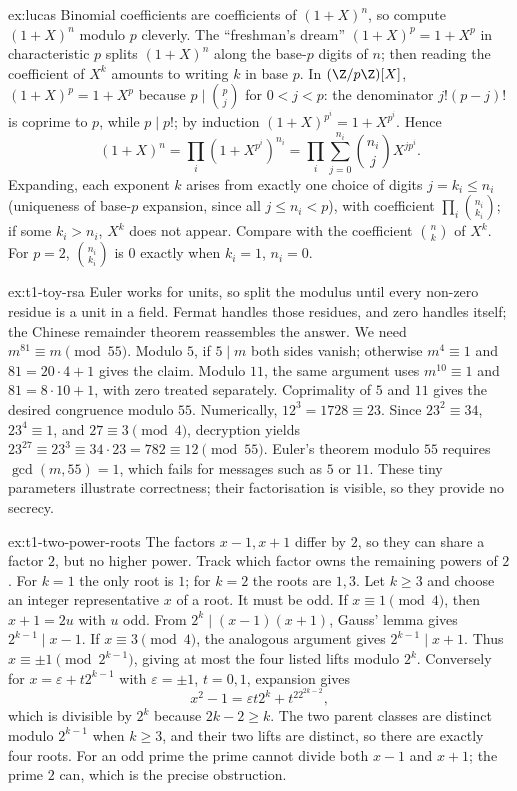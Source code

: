\begin{solution}{ex:lucas}
\idea Binomial coefficients are coefficients of $(1+X)^n$, so compute $(1+X)^n$ modulo $p$ cleverly. The ``freshman's dream'' $(1+X)^p=1+X^p$ in characteristic $p$ splits $(1+X)^n$ along the base-$p$ digits of $n$; then reading the coefficient of $X^k$ amounts to writing $k$ in base $p$.
\writeup In $(\Z/p\Z)[X]$, $(1+X)^p=1+X^p$ because $p\mid\binom pj$ for $0<j<p$: the denominator $j!(p-j)!$ is coprime to $p$, while $p\mid p!$; by induction $(1+X)^{p^i}=1+X^{p^i}$. Hence
\[
(1+X)^n=\prod_i\left(1+X^{p^i}\right)^{n_i}=\prod_i\sum_{j=0}^{n_i}\binom{n_i}jX^{jp^i}.
\]
Expanding, each exponent $k$ arises from exactly one choice of digits $j=k_i\le n_i$ (uniqueness of base-$p$ expansion, since all $j\le n_i<p$), with coefficient $\prod_i\binom{n_i}{k_i}$; if some $k_i>n_i$, $X^k$ does not appear. Compare with the coefficient $\binom nk$ of $X^k$. For $p=2$, $\binom{n_i}{k_i}$ is $0$ exactly when $k_i=1$, $n_i=0$.
\end{solution}

\begin{solution}{ex:t1-toy-rsa}
\idea Euler works for units, so split the modulus until every non-zero residue is a unit in a field. Fermat handles those residues, and zero handles itself; the Chinese remainder theorem reassembles the answer.
\writeup We need $m^{81}\equiv m\pmod{55}$. Modulo $5$, if $5\mid m$ both sides vanish; otherwise $m^4\equiv1$ and $81=20\cdot4+1$ gives the claim. Modulo $11$, the same argument uses $m^{10}\equiv1$ and $81=8\cdot10+1$, with zero treated separately. Coprimality of $5$ and $11$ gives the desired congruence modulo $55$. Numerically, $12^3=1728\equiv23$. Since $23^2\equiv34$, $23^4\equiv1$, and $27\equiv3\pmod4$, decryption yields $23^{27}\equiv23^3\equiv34\cdot23=782\equiv12\pmod{55}$. Euler's theorem modulo $55$ requires $\gcd(m,55)=1$, which fails for messages such as $5$ or $11$. These tiny parameters illustrate correctness; their factorisation is visible, so they provide no secrecy.
\end{solution}

\begin{solution}{ex:t1-two-power-roots}
\idea The factors $x-1,x+1$ differ by $2$, so they can share a factor $2$, but no higher power. Track which factor owns the remaining powers of $2$.
\writeup For $k=1$ the only root is $1$; for $k=2$ the roots are $1,3$. Let $k\ge3$ and choose an integer representative $x$ of a root. It must be odd. If $x\equiv1\pmod4$, then $x+1=2u$ with $u$ odd. From $2^k\mid(x-1)(x+1)$, Gauss' lemma gives $2^{k-1}\mid x-1$. If $x\equiv3\pmod4$, the analogous argument gives $2^{k-1}\mid x+1$. Thus $x\equiv\pm1\pmod{2^{k-1}}$, giving at most the four listed lifts modulo $2^k$. Conversely for $x=\varepsilon+t2^{k-1}$ with $\varepsilon=\pm1$, $t=0,1$, expansion gives
\[
x^2-1=\varepsilon t2^k+t^22^{2k-2},
\]
which is divisible by $2^k$ because $2k-2\ge k$. The two parent classes are distinct modulo $2^{k-1}$ when $k\ge3$, and their two lifts are distinct, so there are exactly four roots. For an odd prime the prime cannot divide both $x-1$ and $x+1$; the prime $2$ can, which is the precise obstruction.
\end{solution}

